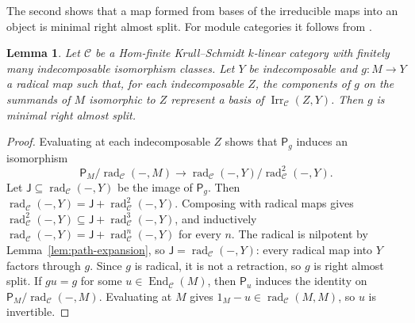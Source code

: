 \documentclass[a4paper,reqno,10pt]{amsart}
\newtheorem{lemma}[theorem]{Lemma}
\theoremstyle{definition}
\numberwithin{equation}{section}
\DeclareMathOperator{\End}{End}
\DeclareMathOperator{\Irr}{Irr}
\DeclareMathOperator{\rad}{rad}
\newcommand{\cC}{\mathcal C}
\begin{document}
The second shows that a map formed from bases of the irreducible maps
into an object is minimal right almost split. For module categories it
follows from \cite[VII, Lemma~1.2 and Proposition~1.3]{ARS}.
\begin{lemma}\label{lem:basis-almost-split}
Let \(\cC\) be a Hom-finite Krull--Schmidt \(k\)-linear category with
finitely many indecomposable isomorphism classes. Let
\(Y\) be indecomposable and \(g:M\to Y\) a radical map such that, for each
indecomposable \(Z\), the components of \(g\) on the summands of \(M\)
isomorphic to \(Z\) represent a basis of \(\Irr_{\cC}(Z,Y)\). Then \(g\) is
minimal right almost split.
\end{lemma}
\begin{proof}
Evaluating at each indecomposable \(Z\) shows that \(\mathsf P_g\) induces
an isomorphism
\[
 \mathsf P_M/\rad_{\cC}(-,M)\longrightarrow
 \rad_{\cC}(-,Y)/\rad_{\cC}^2(-,Y).
\]
Let \(\mathsf J\subseteq\rad_{\cC}(-,Y)\) be the image of \(\mathsf P_g\). Then
\(\rad_{\cC}(-,Y)=\mathsf J+\rad_{\cC}^2(-,Y)\). Composing with radical maps gives
\(\rad_{\cC}^2(-,Y)\subseteq \mathsf J+\rad_{\cC}^3(-,Y)\), and inductively
\(\rad_{\cC}(-,Y)=\mathsf J+\rad_{\cC}^n(-,Y)\) for every \(n\). The radical is
nilpotent by Lemma~\ref{lem:path-expansion}, so \(\mathsf J=\rad_{\cC}(-,Y)\):
every radical map into \(Y\) factors through \(g\). Since \(g\) is radical,
it is not a retraction, so \(g\) is right almost split. If \(gu=g\) for
some \(u\in\End_{\cC}(M)\), then \(\mathsf P_u\) induces the identity on
\(\mathsf P_M/\rad_{\cC}(-,M)\). Evaluating at \(M\) gives
\(1_M-u\in\rad_{\cC}(M,M)\), so \(u\) is invertible.
\end{proof}
\end{document}

